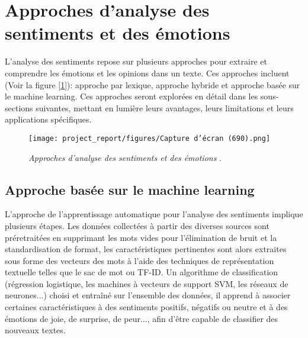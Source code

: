 \section{Approches d'analyse des sentiments et des émotions}
L'analyse des sentiments repose sur plusieurs approches pour extraire et comprendre les émotions et les opinions dans un texte. Ces approches incluent (Voir la figure [\ref{fig:figure7}]): approche par lexique, approche hybride et approche basée sur le machine learning. Ces approches seront explorées en détail dans les sous-sections suivantes, mettant en lumière leurs avantages, leurs limitations et leurs applications spécifiques.

\begin{figure}[h]
    \centering
    \texttt{[image: project\_report/figures/Capture d’écran (690).png]} 
    \caption{\textit{Approches d'analyse des sentiments et des émotions }.}
        \label{fig:figure7}
 
\end{figure}

\subsection{Approche basée sur le machine learning}
L’approche de l’apprentissage automatique pour l’analyse des sentiments implique plusieurs étapes. Les données collectées à partir des diverses sources sont préretraitées en supprimant les mots vides pour l’élimination de bruit et la standardisation de format, les caractéristiques pertinentes sont alors extraites sous forme des vecteurs des mots à l’aide des techniques de représentation textuelle telles que le sac de mot ou TF-ID. Un algorithme de classification (régression logistique, les machines à vecteurs de support SVM, les réseaux de neurones...) choisi et entraîné sur l’ensemble des données, il apprend à associer certaines caractéristiques à des sentiments positifs, négatifs ou neutre et à des émotions de joie, de surprise, de peur..., afin d’être capable de classifier des nouveaux textes.  


